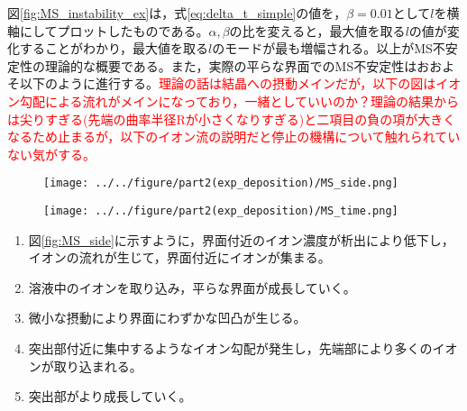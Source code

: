\documentclass[autodetect-engine,dvi=dvipdfmx,a4paper,ja=standard,oneside,openany,11pt,draft]{bxjsbook}
\begin{document}
図\ref{fig:MS_instability_ex}は，式\ref{eq:delta_t_simple}の値を，$\beta=0.01$として$l$を横軸にしてプロットしたものである。$\alpha,\beta$の比を変えると，最大値を取る$l$の値が変化することがわかり，最大値を取る$l$のモードが最も増幅される。以上がMS不安定性の理論的な概要である。また，実際の平らな界面でのMS不安定性はおおよそ以下のように進行する。\textcolor{red}{理論の話は結晶への摂動メインだが，以下の図はイオン勾配による流れがメインになっており，一緒としていいのか？理論の結果からは尖りすぎる(先端の曲率半径Rが小さくなりすぎる)と二項目の負の項が大きくなるため止まるが，以下のイオン流の説明だと停止の機構について触れられていない気がする。}
\begin{figure}[H]
  \begin{minipage}
    {0.5\textwidth}
    \centering
    \texttt{[image: ../../figure/part2(exp\_deposition)/MS\_side.png]}
    \label{fig:MS_side}
  \end{minipage}
  \begin{minipage}
    {0.5\textwidth}
    \centering
    \texttt{[image: ../../figure/part2(exp\_deposition)/MS\_time.png]}
    \label{fig:MS_top}
  \end{minipage}
\end{figure}
\begin{enumerate}
  \item 図\ref{fig:MS_side}に示すように，界面付近のイオン濃度が析出により低下し，イオンの流れが生じて，界面付近にイオンが集まる。
  \item 溶液中のイオンを取り込み，平らな界面が成長していく。
  \item 微小な摂動により界面にわずかな凹凸が生じる。
  \item 突出部付近に集中するようなイオン勾配が発生し，先端部により多くのイオンが取り込まれる。
  \item 突出部がより成長していく。
\end{enumerate}

\ifdraft{
  
  
}{}
\end{document}
